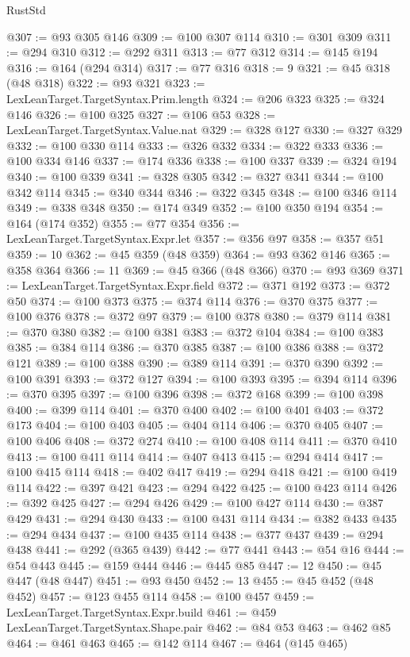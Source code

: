\begin{lexlean}{RustStd}
\begin{coremodule}
@307 := @93 @305 @146
@309 := @100 @307 @114
@310 := @301 @309
@311 := @294 @310
@312 := @292 @311
@313 := @77 @312
@314 := @145 @194
@316 := @164 (@294 @314)
@317 := @77 @316
@318 := 9
@321 := @45 @318 (@48 @318)
@322 := @93 @321
@323 := LexLeanTarget.TargetSyntax.Prim.length
@324 := @206 @323
@325 := @324 @146
@326 := @100 @325
@327 := @106 @53
@328 := LexLeanTarget.TargetSyntax.Value.nat
@329 := @328 @127
@330 := @327 @329
@332 := @100 @330 @114
@333 := @326 @332
@334 := @322 @333
@336 := @100 @334 @146
@337 := @174 @336
@338 := @100 @337
@339 := @324 @194
@340 := @100 @339
@341 := @328 @305
@342 := @327 @341
@344 := @100 @342 @114
@345 := @340 @344
@346 := @322 @345
@348 := @100 @346 @114
@349 := @338 @348
@350 := @174 @349
@352 := @100 @350 @194
@354 := @164 (@174 @352)
@355 := @77 @354
@356 := LexLeanTarget.TargetSyntax.Expr.let
@357 := @356 @97
@358 := @357 @51
@359 := 10
@362 := @45 @359 (@48 @359)
@364 := @93 @362 @146
@365 := @358 @364
@366 := 11
@369 := @45 @366 (@48 @366)
@370 := @93 @369
@371 := LexLeanTarget.TargetSyntax.Expr.field
@372 := @371 @192
@373 := @372 @50
@374 := @100 @373
@375 := @374 @114
@376 := @370 @375
@377 := @100 @376
@378 := @372 @97
@379 := @100 @378
@380 := @379 @114
@381 := @370 @380
@382 := @100 @381
@383 := @372 @104
@384 := @100 @383
@385 := @384 @114
@386 := @370 @385
@387 := @100 @386
@388 := @372 @121
@389 := @100 @388
@390 := @389 @114
@391 := @370 @390
@392 := @100 @391
@393 := @372 @127
@394 := @100 @393
@395 := @394 @114
@396 := @370 @395
@397 := @100 @396
@398 := @372 @168
@399 := @100 @398
@400 := @399 @114
@401 := @370 @400
@402 := @100 @401
@403 := @372 @173
@404 := @100 @403
@405 := @404 @114
@406 := @370 @405
@407 := @100 @406
@408 := @372 @274
@410 := @100 @408 @114
@411 := @370 @410
@413 := @100 @411 @114
@414 := @407 @413
@415 := @294 @414
@417 := @100 @415 @114
@418 := @402 @417
@419 := @294 @418
@421 := @100 @419 @114
@422 := @397 @421
@423 := @294 @422
@425 := @100 @423 @114
@426 := @392 @425
@427 := @294 @426
@429 := @100 @427 @114
@430 := @387 @429
@431 := @294 @430
@433 := @100 @431 @114
@434 := @382 @433
@435 := @294 @434
@437 := @100 @435 @114
@438 := @377 @437
@439 := @294 @438
@441 := @292 (@365 @439)
@442 := @77 @441
@443 := @54 @16
@444 := @54 @443
@445 := @159 @444
@446 := @445 @85
@447 := 12
@450 := @45 @447 (@48 @447)
@451 := @93 @450
@452 := 13
@455 := @45 @452 (@48 @452)
@457 := @123 @455 @114
@458 := @100 @457
@459 := LexLeanTarget.TargetSyntax.Expr.build
@461 := @459 LexLeanTarget.TargetSyntax.Shape.pair
@462 := @84 @53
@463 := @462 @85
@464 := @461 @463
@465 := @142 @114
@467 := @464 (@145 @465)

\end{coremodule}
\end{lexlean}

